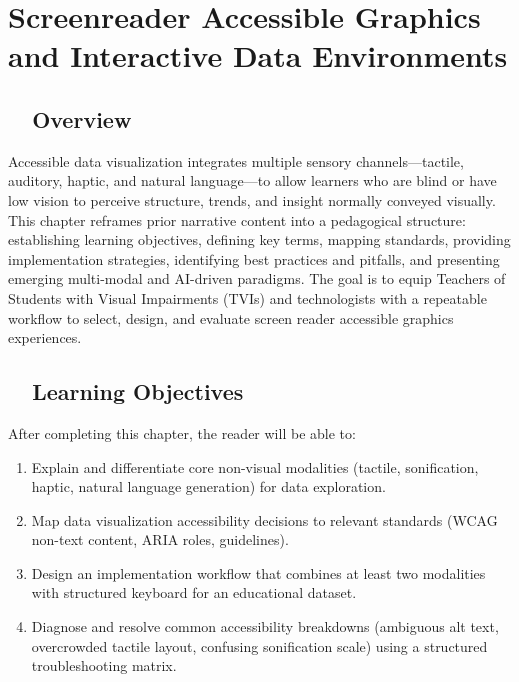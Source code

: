 \chapter{Screenreader Accessible Graphics and Interactive Data Environments}\label{ch13:accessible-graphics}
\raggedright
{}

\section{~~Overview}\label{ch13:sec:overview}
Accessible data visualization integrates multiple sensory channels—tactile, auditory, haptic, and natural language—to allow learners who are blind or have low vision to perceive structure, trends, and insight normally conveyed visually. This chapter reframes prior narrative content into a pedagogical structure: establishing learning objectives, defining key terms, mapping standards, providing implementation strategies, identifying best practices and pitfalls, and presenting emerging multi-modal and AI-driven paradigms. The goal is to equip Teachers of Students with Visual Impairments (TVIs) and  technologists with a repeatable workflow to select, design, and evaluate screen reader accessible graphics experiences.

\section{~~Learning Objectives}\label{ch13:sec:learning-objectives}
After completing this chapter, the reader will be able to:
\begin{enumerate}
	\item Explain and differentiate core non-visual modalities (tactile, sonification, haptic, natural language generation) for data exploration.
	\item Map data visualization accessibility decisions to relevant standards (WCAG non-text content, ARIA roles,  guidelines).
	\item Design an implementation workflow that combines at least two modalities with structured keyboard  for an educational dataset.
	\item Diagnose and resolve common accessibility breakdowns (ambiguous alt text, overcrowded tactile layout, confusing sonification scale) using a structured troubleshooting matrix.
\end{enumerate}

